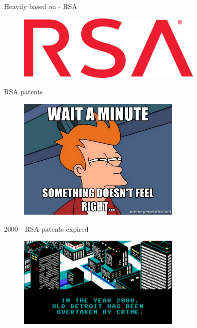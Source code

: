 \documentclass[10pt, compress, aspectratio=169]{beamer}
\begin{document}
\begin{frame}{Heavily based on - RSA}
  \begin{figure}[ht]
    \centering
    \includegraphics[width=0.8\textwidth, keepaspectratio=true]{images/rsa.png}
  \end{figure}
\end{frame}

\begin{frame}{RSA patents}
  \begin{figure}[ht]
    \centering
    \includegraphics[width=0.7\textwidth, keepaspectratio=true]{images/wait.jpg}
  \end{figure}
\end{frame}

\begin{frame}{2000 - RSA patents expired}
  \begin{figure}[ht]
    \centering
    \includegraphics[width=0.7\textwidth, keepaspectratio=true]{images/2000.png}
  \end{figure}
\end{frame}
\end{document}
